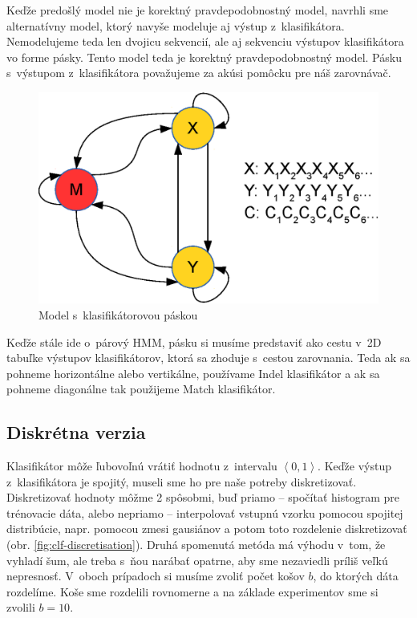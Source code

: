 Keďže predošlý model nie je korektný pravdepodobnostný model, navrhli sme alternatívny model, ktorý navyše modeluje aj výstup z~klasifikátora.
Nemodelujeme teda len dvojicu sekvencií, ale aj sekvenciu výstupov klasifikátora vo forme pásky. Tento model teda je korektný pravdepodobnostný model.
Pásku s~výstupom z~klasifikátora považujeme za akúsi pomôcku pre náš zarovnávač.

\begin{figure}[htp]
    \centering
    \includegraphics[width=.5\textwidth]{images/model_clf_paska}
    \caption{Model s~klasifikátorovou páskou}
\end{figure}

Keďže stále ide o~párový HMM, pásku si musíme predstaviť ako cestu v~2D tabuľke výstupov klasifikátorov, ktorá sa zhoduje s~cestou zarovnania. Teda ak sa pohneme horizontálne  alebo vertikálne, používame Indel klasifikátor a ak sa pohneme diagonálne tak použijeme Match klasifikátor.

\subsection{Diskrétna verzia}

Klasifikátor môže ľubovoľnú vrátiť hodnotu z~intervalu $\left<0,1 \right>$. Keďže výstup z~klasifikátora je spojitý, museli sme ho pre naše potreby diskretizovať.
Diskretizovať hodnoty môžme 2 spôsobmi, buď priamo -- spočítať histogram pre trénovacie dáta, alebo nepriamo -- interpolovať vstupnú vzorku pomocou spojitej distribúcie, napr. pomocou zmesi gausiánov a potom toto rozdelenie diskretizovať (obr. \ref{fig:clf-discretisation}). Druhá spomenutá metóda má výhodu v~tom, že vyhladí šum, ale treba s~ňou narábať opatrne, aby sme nezaviedli príliš veľkú nepresnosť. V~oboch prípadoch si musíme zvoliť počet košov $b$, do ktorých dáta rozdelíme. Koše sme rozdelili rovnomerne a na základe experimentov sme si zvolili $b = 10$.

